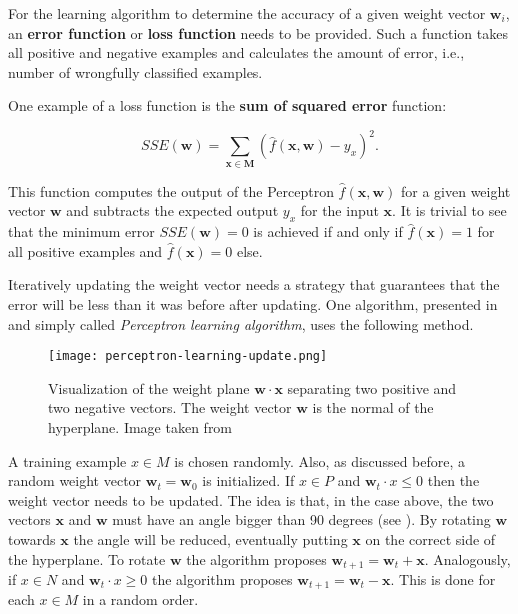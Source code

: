 For the learning algorithm to determine the accuracy of a given weight vector $\bm{w}_i$, an \textbf{error function} or \textbf{loss function} needs to be provided.
Such a function takes all positive and negative examples and calculates the amount of error, i.e., number of wrongfully classified examples.

One example of a loss function is the \textbf{sum of squared error} function:

\begin{equation}
    \label{eq:sse-loss}
    SSE(\bm{w}) = \sum_{\bm{x} \in \bm{M}} (\hat{f}(\bm{x}, \bm{w}) - y_x)^2.
\end{equation}

This function computes the output of the Perceptron $\hat{f}(\bm{x}, \bm{w})$ for a given weight vector $\bm{w}$ and subtracts the expected output $y_x$ for the input $\bm{x}$.
It is trivial to see that the minimum error $SSE(\bm{w}) = 0$ is achieved if and only if $\hat{f}(\bm{x}) = 1$ for all positive examples and $\hat{f}(\bm{x}) = 0$ else.

Iteratively updating the weight vector needs a strategy that guarantees that the error will be less than it was before after updating.
One algorithm, presented in \cite{rojas_neural_1996} and simply called \textit{Perceptron learning algorithm}, uses the following method.

\begin{figure}[htb!]
    \centering
    \texttt{[image: perceptron-learning-update.png]}
    \caption{Visualization of the weight plane $\bm{w} \cdot \bm{x}$ separating two positive and two negative vectors. The weight vector $\bm{w}$ is the normal of the hyperplane. Image taken from \cite{rojas_neural_1996}}
    \label{fig:perceptron-learning-update}
\end{figure}

A training example $x \in M$ is chosen randomly.
Also, as discussed before, a random weight vector $\bm{w}_t = \bm{w}_0$ is initialized.
If $x \in P$ and $\bm{w}_t \cdot x \leq 0$ then the weight vector needs to be updated.
The idea is that, in the case above, the two vectors $\bm{x}$ and $\bm{w}$ must have an angle bigger than 90 degrees (see ).
By rotating $\bm{w}$ towards $\bm{x}$ the angle will be reduced, eventually putting $\bm{x}$ on the correct side of the hyperplane.
To rotate $\bm{w}$ the algorithm proposes $\bm{w}_{t+1} = \bm{w}_{t} + \bm{x}$.
Analogously, if $x \in N$ and $\bm{w}_t \cdot x \geq 0$ the algorithm proposes $\bm{w}_{t+1} = \bm{w}_{t} - \bm{x}$.
This is done for each $x \in M$ in a random order.

